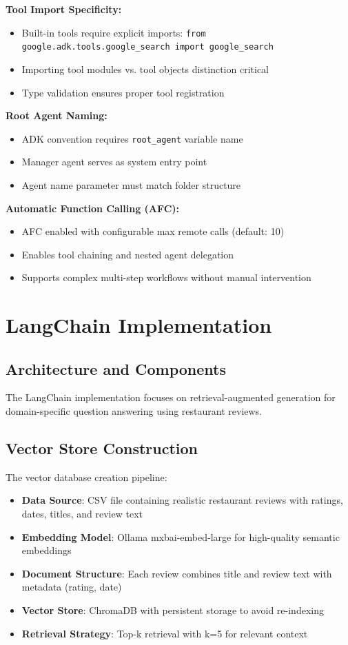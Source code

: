 \documentclass[12pt,a4paper]{article}
\begin{document}
\textbf{Tool Import Specificity:}
\begin{itemize}
    \item Built-in tools require explicit imports: \texttt{from google.adk.tools.google\_search import google\_search}
    \item Importing tool modules vs. tool objects distinction critical
    \item Type validation ensures proper tool registration
\end{itemize}

\textbf{Root Agent Naming:}
\begin{itemize}
    \item ADK convention requires \texttt{root\_agent} variable name
    \item Manager agent serves as system entry point
    \item Agent name parameter must match folder structure
\end{itemize}

\textbf{Automatic Function Calling (AFC):}
\begin{itemize}
    \item AFC enabled with configurable max remote calls (default: 10)
    \item Enables tool chaining and nested agent delegation
    \item Supports complex multi-step workflows without manual intervention
\end{itemize}

\section{LangChain Implementation}

\subsection{Architecture and Components}

The LangChain implementation focuses on retrieval-augmented generation for domain-specific question answering using restaurant reviews.

\subsection{Vector Store Construction}

The vector database creation pipeline:
\begin{itemize}
    \item \textbf{Data Source}: CSV file containing realistic restaurant reviews with ratings, dates, titles, and review text
    \item \textbf{Embedding Model}: Ollama mxbai-embed-large for high-quality semantic embeddings
    \item \textbf{Document Structure}: Each review combines title and review text with metadata (rating, date)
    \item \textbf{Vector Store}: ChromaDB with persistent storage to avoid re-indexing
    \item \textbf{Retrieval Strategy}: Top-k retrieval with k=5 for relevant context
\end{itemize}
\end{document}
